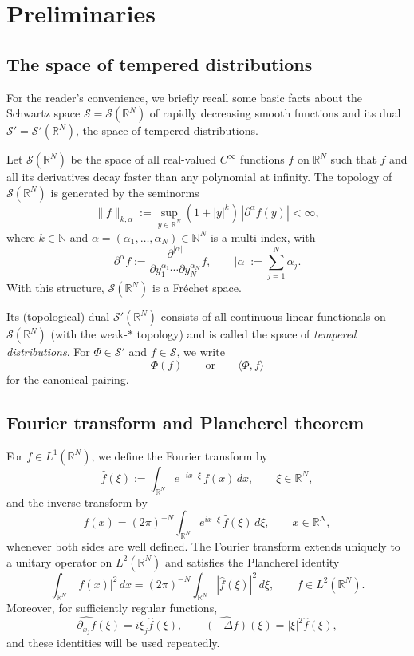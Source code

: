 \documentclass[12pt, reqno]{amsart}
\newcommand{\R}{\ensuremath{\mathbb{R}}}
\newcommand{\N}{\ensuremath{\mathbb{N}}}
\begin{document}
\section{Preliminaries}\label{Prelim}

\subsection{The space of tempered distributions}
For the reader's convenience, we briefly recall some basic facts about the Schwartz space
$\mathcal S=\mathcal S(\R^N)$ of rapidly decreasing smooth functions and its dual
$\mathcal S'=\mathcal S'(\R^N)$, the space of tempered distributions.

Let $\mathcal S(\R^N)$ be the space of all real-valued $C^\infty$ functions $f$ on $\R^N$ such that
$f$ and all its derivatives decay faster than any polynomial at infinity.
The topology of $\mathcal S(\R^N)$ is generated by the seminorms
\[
\|f\|_{k,\alpha}
:=\sup_{y\in\R^N}(1+|y|^k)\,|\partial^\alpha f(y)|<\infty,
\]
where $k\in\N$ and $\alpha=(\alpha_1,\dots,\alpha_N)\in\N^N$ is a multi-index, with
\[
\partial^\alpha f
:=\frac{\partial^{|\alpha|}}{\partial y_1^{\alpha_1}\cdots \partial y_N^{\alpha_N}}f,
\qquad
|\alpha|:=\sum_{j=1}^N\alpha_j.
\]
With this structure, $\mathcal S(\R^N)$ is a Fr\'echet space.

Its (topological) dual $\mathcal S'(\R^N)$ consists of all continuous linear functionals on
$\mathcal S(\R^N)$ (with the weak-$\ast$ topology) and is called the space of
\emph{tempered distributions}. For $\Phi\in\mathcal S'$ and $f\in\mathcal S$, we write
\[
\Phi(f)\qquad\text{or}\qquad \langle \Phi,f\rangle
\]
for the canonical pairing.

\subsection*{Fourier transform and Plancherel theorem}
For $f\in L^1(\R^N)$, we define the Fourier transform by
\[
\widehat f(\xi):=\int_{\R^N}e^{-ix\cdot\xi}\,f(x)\,dx,
\qquad \xi\in\R^N,
\]
and the inverse transform by
\[
f(x)=(2\pi)^{-N}\int_{\R^N}e^{ix\cdot\xi}\,\widehat f(\xi)\,d\xi,
\qquad x\in\R^N,
\]
whenever both sides are well defined. The Fourier transform extends uniquely to a unitary
operator on $L^2(\R^N)$ and satisfies the Plancherel identity
\begin{equation}\label{planch}
\int_{\R^N}|f(x)|^2\,dx
=(2\pi)^{-N}\int_{\R^N}|\widehat f(\xi)|^2\,d\xi,
\qquad f\in L^2(\R^N).
\end{equation}
Moreover, for sufficiently regular functions,
\[
\widehat{\partial_{x_j}f}(\xi)=i\xi_j\widehat f(\xi),
\qquad
\widehat{(-\Delta f)}(\xi)=|\xi|^2\widehat f(\xi),
\]
and these identities will be used repeatedly.
\end{document}
